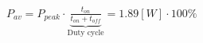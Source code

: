 \documentclass[preview]{standalone}
\begin{document}
\begin{center}
$P_{av} = P_{peak} \cdot \underbrace{\frac{t_{on}}{t_{on}+t_{off}}}_{\text{Duty cycle}}=$$1.89 [W] \cdot 100 \%$
\end{center}
\end{document}
